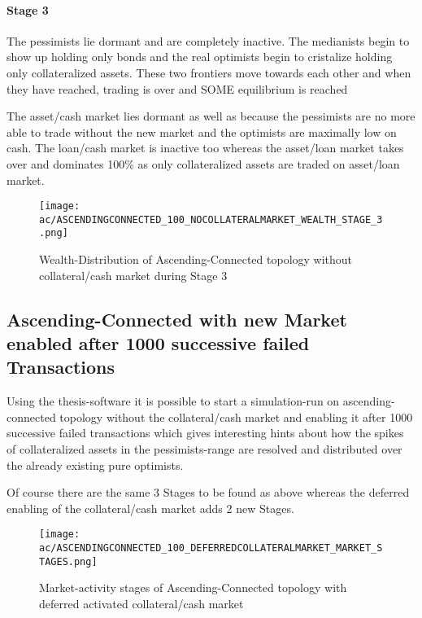 \documentclass[Bachelorarbeit.tex]{subfiles}
\begin{document}
\paragraph{Stage 3}
The pessimists lie dormant and are completely inactive. The medianists begin to show up holding only bonds and the real optimists begin to cristalize holding only collateralized assets. These two frontiers move towards each other and when they have reached, trading is over and SOME equilibrium is reached

\medskip

The asset/cash market lies dormant as well as because the pessimists are no more able to trade without the new market and the optimists are maximally low on cash. The loan/cash market is inactive too whereas the asset/loan market takes over and dominates 100\% as only collateralized assets are traded on asset/loan market.

\begin{figure}[H]
	\centering
  \texttt{[image: ac/ASCENDINGCONNECTED\_100\_NOCOLLATERALMARKET\_WEALTH\_STAGE\_3.png]}
  	\caption{Wealth-Distribution of Ascending-Connected topology without collateral/cash market during Stage 3}
	\label{fig:markets_ASCENDINGCONNECTED_100_NOCOLLATERALMARKET_WEALTH_STAGE_3}
\end{figure}

\subsection{Ascending-Connected with new Market enabled after 1000 successive failed Transactions}
Using the thesis-software it is possible to start a simulation-run on ascending-connected topology without the collateral/cash market and enabling it after 1000 successive failed transactions which gives interesting hints about how the spikes of collateralized assets in the pessimists-range are resolved and distributed over the already existing pure optimists.

\medskip

Of course there are the same 3 Stages to be found as above whereas the deferred enabling of the collateral/cash market adds 2 new Stages.

\begin{figure}[H]
	\centering
  \texttt{[image: ac/ASCENDINGCONNECTED\_100\_DEFERREDCOLLATERALMARKET\_MARKET\_STAGES.png]}
  	\caption{Market-activity stages of Ascending-Connected topology with deferred activated collateral/cash market}
	\label{fig:markets_ASCENDINGCONNECTED_100_DEFERREDCOLLATERALMARKET_MARKET_STAGES}
\end{figure}
\end{document}

